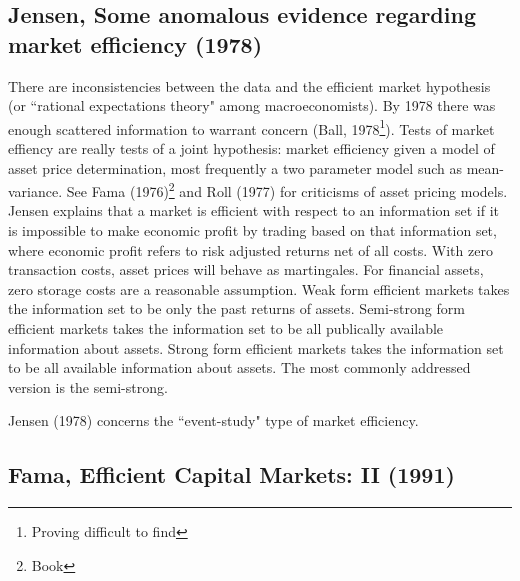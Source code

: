 \subsection[Jensen, 1978]{Jensen, Some anomalous evidence regarding market efficiency
(1978)\cite{jensen1978some}}

There are inconsistencies between the data and the efficient market hypothesis (or
``rational expectations theory" among macroeconomists). By 1978 there was enough scattered
information to warrant concern (Ball, 1978\footnote{Proving difficult to find}). Tests of
market effiency are really tests of a joint hypothesis: market efficiency given a model of
asset price determination, most frequently a two parameter model such as mean-variance.
See Fama (1976)\cite{fama1976foundations}\footnote{Book} and Roll
(1977)\cite{roll1977critique} for criticisms of asset pricing models. Jensen explains that
a market is efficient with respect to an information set if it is impossible to make
economic profit by trading based on that information set, where economic profit refers to
risk adjusted returns net of all costs. With zero transaction costs, asset prices will
behave as martingales. For financial assets, zero storage costs are a reasonable
assumption. Weak form efficient markets takes the information set to be only the past
returns of assets. Semi-strong form efficient markets takes the information set to be all
publically available information about assets. Strong form efficient markets takes the
information set to be all available information about assets. The most commonly addressed
version is the semi-strong.

Jensen (1978) concerns the ``event-study" type of market efficiency.

\subsection[Fama, 1991]{Fama, Efficient Capital Markets: II
(1991)\cite{fama1991efficient}}

